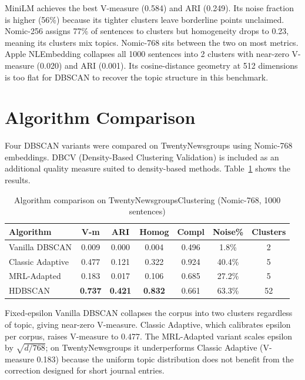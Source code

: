 MiniLM achieves the best V-measure (0.584) and ARI (0.249). Its noise fraction is higher (56\%) because its tighter clusters leave borderline points unclaimed. Nomic-256 assigns 77\% of sentences to clusters but homogeneity drops to 0.23, meaning its clusters mix topics. Nomic-768 sits between the two on most metrics. Apple NLEmbedding collapses all 1000 sentences into 2 clusters with near-zero V-measure (0.020) and ARI (0.001). Its cosine-distance geometry at 512 dimensions is too flat for DBSCAN to recover the topic structure in this benchmark.

\section{Algorithm Comparison}

Four DBSCAN variants were compared on TwentyNewsgroups using Nomic-768 embeddings. DBCV (Density-Based Clustering Validation) \cite{moulavi2014dbcv} is included as an additional quality measure suited to density-based methods. Table~\ref{tab:algorithm_comparison} shows the results.

\begin{table}[h]
\centering
\caption{Algorithm comparison on TwentyNewsgroupsClustering (Nomic-768, 1000 sentences)}
\label{tab:algorithm_comparison}
\begin{tabular}{|l|c|c|c|c|c|c|}
\hline
\textbf{Algorithm} & \textbf{V-m} & \textbf{ARI} & \textbf{Homog} & \textbf{Compl} & \textbf{Noise\%} & \textbf{Clusters} \\
\hline
Vanilla DBSCAN   & 0.009          & 0.000          & 0.004          & 0.496 &  1.8\% &  2 \\
Classic Adaptive & 0.477          & 0.121          & 0.322          & 0.924 & 40.4\% &  5 \\
MRL-Adapted      & 0.183          & 0.017          & 0.106          & 0.685 & 27.2\% &  5 \\
HDBSCAN \cite{campello2013hdbscan} & \textbf{0.737} & \textbf{0.421} & \textbf{0.832} & 0.661 & 63.3\% & 52 \\
\hline
\end{tabular}
\end{table}

Fixed-epsilon Vanilla DBSCAN collapses the corpus into two clusters regardless of topic, giving near-zero V-measure. Classic Adaptive, which calibrates epsilon per corpus, raises V-measure to 0.477. The MRL-Adapted variant scales epsilon by $\sqrt{d/768}$; on TwentyNewsgroups it underperforms Classic Adaptive (V-measure 0.183) because the uniform topic distribution does not benefit from the correction designed for short journal entries.

